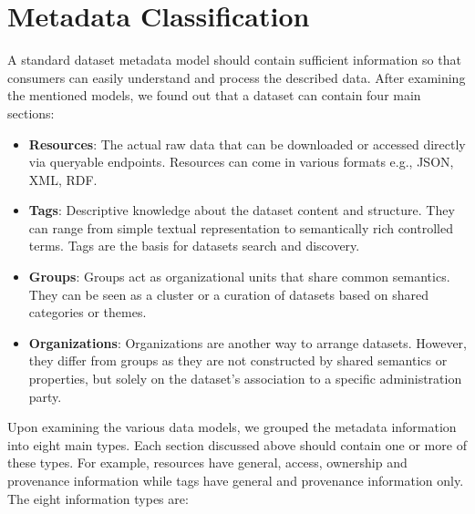 \documentclass[runningheads,a4paper]{llncs}
\begin{document}

\section{Metadata Classification}
\label{sec:metadata}

A standard dataset metadata model should contain sufficient information so that consumers can easily understand and process the described data. After examining the mentioned models, we found out that a dataset can contain four main sections:

\begin{itemize}
  \item \textbf{Resources}: The actual raw data that can be downloaded or accessed directly via queryable endpoints. Resources can come in various formats e.g., JSON, XML, RDF.
  \item \textbf{Tags}: Descriptive knowledge about the dataset content and structure. They can range from simple textual representation to semantically rich controlled terms. Tags are the basis for datasets search and discovery.
  \item \textbf{Groups}: Groups act as organizational units that share common semantics. They can be seen as a cluster or a curation of datasets based on shared categories or themes.
  \item \textbf{Organizations}: Organizations are another way to arrange datasets. However, they differ from groups as they are not constructed by shared semantics or properties, but solely on the dataset's association to a specific administration party.
\end{itemize}

Upon examining the various data models, we grouped the metadata information into eight main types. Each section discussed above should contain one or more of these types. For example, resources have general, access, ownership and provenance information while tags have general and provenance information only. The eight information types are:
\end{document}
